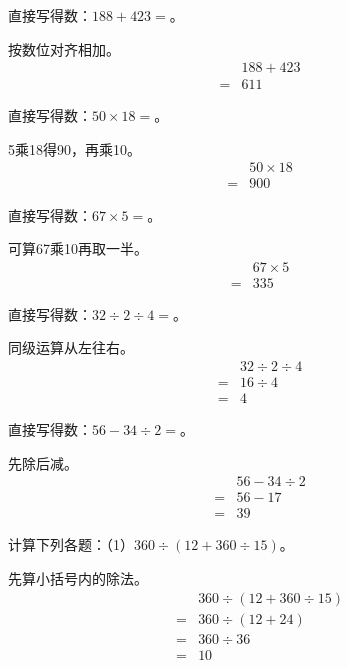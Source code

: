 直接写得数：\(188+423=\)。\par
\begin{BookAnswer}
按数位对齐相加。\[\begin{aligned} &188+423\\={}&611\end{aligned}\]
\end{BookAnswer}

直接写得数：\(50\times18=\)。\par
\begin{BookAnswer}
5乘18得90，再乘10。\[\begin{aligned} &50\times18\\={}&900\end{aligned}\]
\end{BookAnswer}

直接写得数：\(67\times5=\)。\par
\begin{BookAnswer}
可算67乘10再取一半。\[\begin{aligned} &67\times5\\={}&335\end{aligned}\]
\end{BookAnswer}

直接写得数：\(32\div2\div4=\)。\par
\begin{BookAnswer}
同级运算从左往右。\[\begin{aligned} &32\div2\div4\\={}&16\div4\\={}&4\end{aligned}\]
\end{BookAnswer}

直接写得数：\(56-34\div2=\)。\par
\begin{BookAnswer}
先除后减。\[\begin{aligned} &56-34\div2\\={}&56-17\\={}&39\end{aligned}\]
\end{BookAnswer}

计算下列各题：（1）\(360\div(12+360\div15)\)。\par
\begin{BookAnswer}
先算小括号内的除法。\[\begin{aligned} &360\div(12+360\div15)\\={}&360\div(12+24)\\={}&360\div36\\={}&10\end{aligned}\]
\end{BookAnswer}

